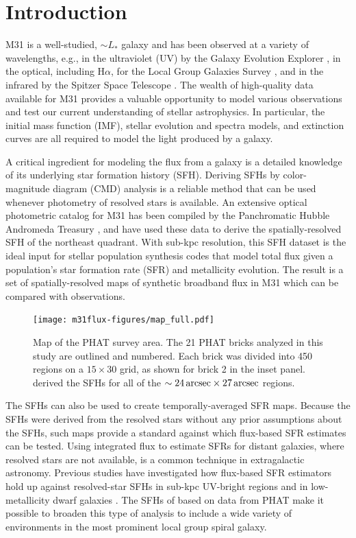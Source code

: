 \documentclass[iop, tighten]{emulateapj}
\begin{document}
\section{Introduction}

M31 is a well-studied, $\sim L_\ast$ galaxy and has been observed at a variety
of wavelengths, e.g., in the ultraviolet (UV) by the Galaxy Evolution Explorer
\citep[GALEX;][]{Morrissey:2007}, in the optical, including H$\alpha$, for the
Local Group Galaxies Survey \citep{Massey:2006}, and in the infrared by the
Spitzer Space Telescope \citep{Gordon:2006}. The wealth of high-quality data
available for M31 provides a valuable opportunity to model various observations
and test our current understanding of stellar astrophysics. In particular, the
initial mass function (IMF), stellar evolution and spectra models, and
extinction curves are all required to model the light produced by a galaxy.

A critical ingredient for modeling the flux from a galaxy is a detailed
knowledge of its underlying star formation history (SFH). Deriving SFHs by
color-magnitude diagram (CMD) analysis is a reliable method that can be used
whenever photometry of resolved stars is available. An extensive optical
photometric catalog for M31 has been compiled by the Panchromatic Hubble
Andromeda Treasury \citep[PHAT][]{Dalcanton:2012}, and \citet{Lewis:2014} have
used these data to derive the spatially-resolved SFH of the northeast quadrant.
With sub-kpc resolution, this SFH dataset is the ideal input for stellar
population synthesis codes that model total flux given a population's star
formation rate (SFR) and metallicity evolution. The result is a set of
spatially-resolved maps of synthetic broadband flux in M31 which can be
compared with observations.


\begin{figure}
\centering
\texttt{[image: m31flux-figures/map\_full.pdf]}
\caption[PHAT survey map.]{Map of the PHAT survey area. The 21 PHAT bricks
    analyzed in this study are outlined and numbered. Each brick was divided
    into 450 regions on a $15 \times 30$ grid, as shown for brick 2 in the
    inset panel. \citet{Lewis:2014} derived the SFHs for all of the $\sim
    24\,\mathrm{arcsec} \times 27\,\mathrm{arcsec}$ regions.
}
\label{fig:mfx:map}
\end{figure}


The \citet{Lewis:2014} SFHs can also be used to create temporally-averaged SFR
maps. Because the SFHs were derived from the resolved stars without any prior
assumptions about the SFHs, such maps provide a standard against which
flux-based SFR estimates \citep[e.g., using any of the calibrations
from][]{Kennicutt:2012} can be tested. Using integrated flux to estimate SFRs
for distant galaxies, where resolved stars are not available, is a common
technique in extragalactic astronomy. Previous studies have investigated how
flux-based SFR estimators hold up against resolved-star SFHs in sub-kpc
UV-bright regions \citep{Simones:2014} and in low-metallicity dwarf galaxies
\citep{McQuinn:2014}. The SFHs of \citet{Lewis:2014} based on data from PHAT
make it possible to broaden this type of analysis to include a wide variety of
environments in the most prominent local group spiral galaxy.
\end{document}
